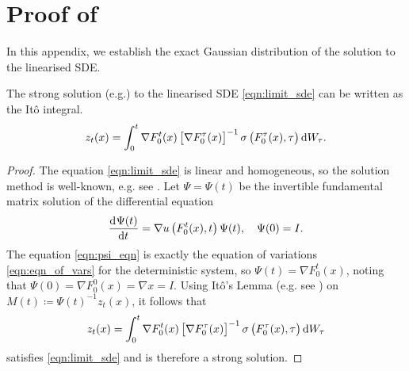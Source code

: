 \section{Proof of }\label{app:gauss_dist_proof}
In this appendix, we establish the exact Gaussian distribution of the solution to the linearised SDE.
\begin{lemma}\label{lem:z_lim_sol}
	The strong solution (e.g.\cite[Def. 6.1.1]{KallianpurSundar_2014_StochasticAnalysisDiffusion}) to the linearised SDE \eqref{eqn:limit_sde} can be written as the It\^o integral.
	\begin{equation}
		z_t(x) = \int_0^t{\nabla F_0^t(x)\left[\nabla F_0^\tau(x)\right]^{-1}\sigma\left(F_0^\tau(x), \tau\right)\dif W_\tau}.
		\label{eqn:z_ito_form}
	\end{equation}
\end{lemma}

\begin{proof}
	The equation \eqref{eqn:limit_sde} is linear and homogeneous, so the solution method is well-known, e.g. see \cite[\S4.3]{SarkkaSolin_2019_AppliedStochasticDifferential}.
	Let \(\Psi = \Psi(t)\) be the invertible fundamental matrix solution of the differential equation
	\begin{equation}
		\dod{\Psi(t)}{t} = \nabla u\left(F_0^t(x), t\right)\Psi(t), \quad \Psi(0) = I.
		\label{eqn:psi_eqn}
	\end{equation}
	The equation \eqref{eqn:psi_eqn} is exactly the equation of variations \eqref{eqn:eqn_of_vars} for the deterministic system, so \(\Psi(t) = \nabla F_0^t(x)\), noting that \(\Psi(0) = \nabla F_0^0(x) = \nabla x = I\).
	Using It\^o's Lemma (e.g. see \cite[Thm. 5.5.1]{KallianpurSundar_2014_StochasticAnalysisDiffusion}) on \(M(t) \coloneqq \Psi(t)^{-1}z_t(x)\), it follows that
	\[
		z_t(x) = \int_0^t{\nabla F_0^t(x)\left[\nabla F_0^\tau(x)\right]^{-1}\sigma\left(F_0^\tau(x), \tau\right)\dif W_\tau}
	\]
	satisfies \eqref{eqn:limit_sde} and is therefore a strong solution.
\end{proof}

